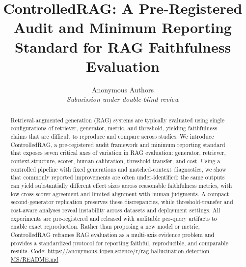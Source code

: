 \documentclass{article}
\title{	
ControlledRAG: A Pre-Registered Audit and Minimum Reporting Standard for RAG Faithfulness Evaluation}
\author{Anonymous Authors\\\textit{Submission under double-blind review}}
\begin{document}
\maketitle


\begin{abstract}
Retrieval-augmented generation (RAG) systems are typically evaluated using single configurations of retriever, generator, metric, and threshold, yielding faithfulness claims that are difficult to reproduce and compare across studies. We introduce ControlledRAG, a pre-registered audit framework and minimum reporting standard that exposes seven critical axes of variation in RAG evaluation: generator, retriever, context structure, scorer, human calibration, threshold transfer, and cost. Using a controlled pipeline with fixed generations and matched-context diagnostics, we show that commonly reported improvements are often under-identified: the same outputs can yield substantially different effect sizes across reasonable faithfulness metrics, with low cross-scorer agreement and limited alignment with human judgments. A compact second-generator replication preserves these discrepancies, while threshold-transfer and cost-aware analyses reveal instability across datasets and deployment settings. All experiments are pre-registered and released with auditable per-query artifacts to enable exact reproduction. Rather than proposing a new model or metric, ControlledRAG reframes RAG evaluation as a multi-axis evidence problem and provides a standardized protocol for reporting faithful, reproducible, and comparable results. Code: \url{https://anonymous.4open.science/r/rag-hallucination-detection-MS/README.md}
\end{abstract}








\clearpage
\appendix



\clearpage

\end{document}
